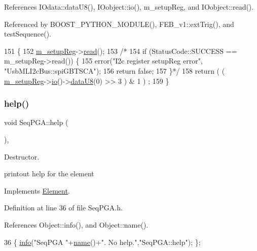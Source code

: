 References I\+Odata\+::data\+U8(), I\+Oobject\+::io(), m\+\_\+setup\+Reg, and I\+Oobject\+::read().



Referenced by B\+O\+O\+S\+T\+\_\+\+P\+Y\+T\+H\+O\+N\+\_\+\+M\+O\+D\+U\+L\+E(), F\+E\+B\+\_\+v1\+::ext\+Trig(), and test\+Sequence().


\begin{DoxyCode}
151                      \{
152   \hyperlink{classSeqPGA_a03269241e7fc26493cd0595beda334c2}{m\_setupReg}->\hyperlink{classIOobject_aa07610c11963b1db6710e3c76ceea456}{read}();
153   \textcolor{comment}{/*}
154 \textcolor{comment}{    if (StatusCode::SUCCESS == m\_setupReg->read()) \{}
155 \textcolor{comment}{    error("I2c register setupReg error", "UsbMLI2cBus::spiGBTSCA");}
156 \textcolor{comment}{    return false;}
157 \textcolor{comment}{    \}*/}
158   \textcolor{keywordflow}{return} ( ( \hyperlink{classSeqPGA_a03269241e7fc26493cd0595beda334c2}{m\_setupReg}->\hyperlink{classIOobject_af04fb94137c3d86849f478ac5afab5d1}{io}()->\hyperlink{classIOdata_a75e9c318dbac3a39402179070943d4bc}{dataU8}(0) >> 3 ) & 1 ) ;
159 \}
\end{DoxyCode}
\mbox{\label{classSeqPGA_ae651bb2d5ac33e863951499c638655fe}} 
\subsubsection{\texorpdfstring{help()}{help()}}
{\footnotesize\ttfamily void Seq\+P\+G\+A\+::help (\begin{DoxyParamCaption}{ }\end{DoxyParamCaption})\hspace{0.3cm}{\ttfamily [inline]}, {\ttfamily [virtual]}}



Destructor. 

printout help for the element 

Implements \hyperlink{classElement_a32c0de27acb08e17251cef88c3e9303a}{Element}.



Definition at line 36 of file Seq\+P\+G\+A.\+h.



References Object\+::info(), and Object\+::name().


\begin{DoxyCode}
36 \{ \hyperlink{classObject_a644fd329ea4cb85f54fa6846484b84a8}{info}(\textcolor{stringliteral}{"SeqPGA "}+\hyperlink{classObject_a300f4c05dd468c7bb8b3c968868443c1}{name}()+\textcolor{stringliteral}{". No help."},\textcolor{stringliteral}{"SeqPGA::help"}); \};
\end{DoxyCode}
\mbox{\label{classSeqPGA_ad1629388bbd38b013110ee03a1eea339}} 
